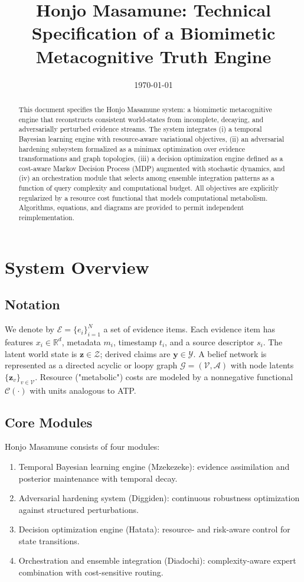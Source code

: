 \documentclass[12pt,a4paper]{article}
\title{Honjo Masamune: Technical Specification of a Biomimetic Metacognitive Truth Engine}
\author{ }
\date{\today}
\begin{document}
\maketitle

\begin{abstract}
This document specifies the Honjo Masamune system: a biomimetic metacognitive engine that reconstructs consistent world-states from incomplete, decaying, and adversarially perturbed evidence streams. The system integrates (i) a temporal Bayesian learning engine with resource-aware variational objectives, (ii) an adversarial hardening subsystem formalized as a minimax optimization over evidence transformations and graph topologies, (iii) a decision optimization engine defined as a cost-aware Markov Decision Process (MDP) augmented with stochastic dynamics, and (iv) an orchestration module that selects among ensemble integration patterns as a function of query complexity and computational budget. All objectives are explicitly regularized by a resource cost functional that models computational metabolism. Algorithms, equations, and diagrams are provided to permit independent reimplementation.
\end{abstract}

\tableofcontents

\section{System Overview}
\subsection{Notation}
We denote by $\mathcal{E} = \{e_i\}_{i=1}^{N}$ a set of evidence items. Each evidence item has features $x_i \in \mathbb{R}^{d}$, metadata $m_i$, timestamp $t_i$, and a source descriptor $s_i$. The latent world state is $\mathbf{z} \in \mathcal{Z}$; derived claims are $\mathbf{y} \in \mathcal{Y}$. A belief network is represented as a directed acyclic or loopy graph $\mathcal{G}=(\mathcal{V},\mathcal{A})$ with node latents $\{\mathbf{z}_v\}_{v \in \mathcal{V}}$. Resource ("metabolic") costs are modeled by a nonnegative functional $\mathcal{C}(\cdot)$ with units analogous to ATP.

\subsection{Core Modules}
Honjo Masamune consists of four modules:
\begin{enumerate}[label=\textbf{M\arabic*}., leftmargin=*]
  \item Temporal Bayesian learning engine (Mzekezeke): evidence assimilation and posterior maintenance with temporal decay.
  \item Adversarial hardening system (Diggiden): continuous robustness optimization against structured perturbations.
  \item Decision optimization engine (Hatata): resource- and risk-aware control for state transitions.
  \item Orchestration and ensemble integration (Diadochi): complexity-aware expert combination with cost-sensitive routing.
\end{enumerate}
\end{document}
